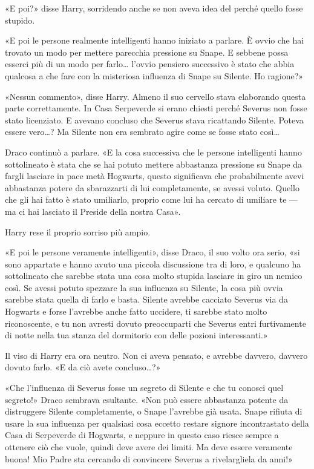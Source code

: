 «E poi?» disse Harry, sorridendo anche se non aveva idea del perché quello fosse stupido.

«E poi le persone realmente intelligenti hanno iniziato a parlare. È ovvio che hai trovato un modo per mettere parecchia pressione su Snape. E sebbene possa esserci più di un modo per farlo… l’ovvio pensiero successivo è stato che abbia qualcosa a che fare con la misteriosa influenza di Snape su Silente. Ho ragione?»

«Nessun commento», disse Harry. Almeno il suo cervello stava elaborando questa parte correttamente. In Casa Serpeverde si erano chiesti perché Severus non fosse stato licenziato. E avevano concluso che Severus stava ricattando Silente. Poteva essere vero…? Ma Silente non era sembrato agire come se fosse stato così…

Draco continuò a parlare. «E la cosa successiva che le persone intelligenti hanno sottolineato è stata che se hai potuto mettere abbastanza pressione su Snape da fargli lasciare in pace metà Hogwarts, questo significava che probabilmente avevi abbastanza potere da sbarazzarti di lui completamente, se avessi voluto. Quello che gli hai fatto è stato umiliarlo, proprio come lui ha cercato di umiliare te — ma ci hai lasciato il Preside della nostra Casa».

Harry rese il proprio sorriso più ampio.

«E poi le persone veramente intelligenti», disse Draco, il suo volto ora serio, «si sono appartate e hanno avuto una piccola discussione tra di loro, e qualcuno ha sottolineato che sarebbe stata una cosa molto stupida lasciare in giro un nemico così. Se avessi potuto spezzare la sua influenza su Silente, la cosa più ovvia sarebbe stata quella di farlo e basta. Silente avrebbe cacciato Severus via da Hogwarts e forse l’avrebbe anche fatto uccidere, ti sarebbe stato molto riconoscente, e tu non avresti dovuto preoccuparti che Severus entri furtivamente di notte nella tua stanza del dormitorio con delle pozioni interessanti.»

Il viso di Harry era ora neutro. Non ci aveva pensato, e avrebbe davvero, davvero dovuto farlo. «E da ciò avete concluso…?»

«Che l’influenza di Severus fosse un segreto di Silente e che tu conosci quel segreto!» Draco sembrava esultante. «Non può essere abbastanza potente da distruggere Silente completamente, o Snape l’avrebbe già usata. Snape rifiuta di usare la sua influenza per qualsiasi cosa eccetto restare signore incontrastato della Casa di Serpeverde di Hogwarts, e neppure in questo caso riesce sempre a ottenere ciò che vuole, quindi deve avere dei limiti. Ma deve essere veramente buona! Mio Padre sta cercando di convincere Severus a rivelargliela da anni!»

